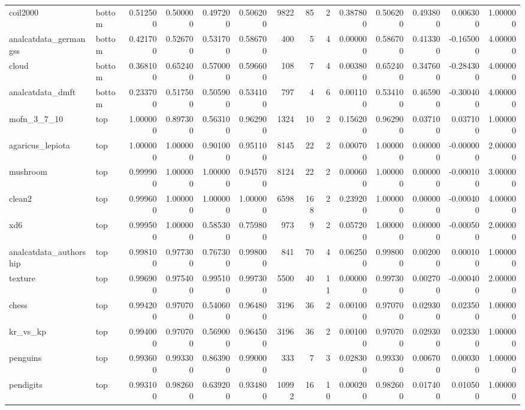 \begin{longtable}{llrrrrrrrrrrrr}
coil2000 & bottom & 0.512500 & 0.500000 & 0.497200 & 0.506200 & 9822 & 85 & 2 & 0.387800 & 0.506200 & 0.493800 & 0.006300 & 1.000000 \\
analcatdata\_germangss & bottom & 0.421700 & 0.526700 & 0.531700 & 0.586700 & 400 & 5 & 4 & 0.000000 & 0.586700 & 0.413300 & -0.165000 & 4.000000 \\
cloud & bottom & 0.368100 & 0.652400 & 0.570000 & 0.596600 & 108 & 7 & 4 & 0.003800 & 0.652400 & 0.347600 & -0.284300 & 4.000000 \\
analcatdata\_dmft & bottom & 0.233700 & 0.517500 & 0.505900 & 0.534100 & 797 & 4 & 6 & 0.001100 & 0.534100 & 0.465900 & -0.300400 & 4.000000 \\
mofn\_3\_7\_10 & top & 1.000000 & 0.897300 & 0.563100 & 0.962900 & 1324 & 10 & 2 & 0.156200 & 0.962900 & 0.037100 & 0.037100 & 1.000000 \\
agaricus\_lepiota & top & 1.000000 & 1.000000 & 0.901000 & 0.951100 & 8145 & 22 & 2 & 0.000700 & 1.000000 & 0.000000 & -0.000000 & 2.000000 \\
mushroom & top & 0.999900 & 1.000000 & 1.000000 & 0.945700 & 8124 & 22 & 2 & 0.000600 & 1.000000 & 0.000000 & -0.000100 & 3.000000 \\
clean2 & top & 0.999600 & 1.000000 & 1.000000 & 1.000000 & 6598 & 168 & 2 & 0.239200 & 1.000000 & 0.000000 & -0.000400 & 4.000000 \\
xd6 & top & 0.999500 & 1.000000 & 0.585300 & 0.759800 & 973 & 9 & 2 & 0.057200 & 1.000000 & 0.000000 & -0.000500 & 2.000000 \\
analcatdata\_authorship & top & 0.998100 & 0.977300 & 0.767300 & 0.998000 & 841 & 70 & 4 & 0.062500 & 0.998000 & 0.002000 & 0.000100 & 1.000000 \\
texture & top & 0.996900 & 0.975400 & 0.995100 & 0.997300 & 5500 & 40 & 11 & 0.000000 & 0.997300 & 0.002700 & -0.000400 & 2.000000 \\
chess & top & 0.994200 & 0.970700 & 0.540600 & 0.964800 & 3196 & 36 & 2 & 0.001000 & 0.970700 & 0.029300 & 0.023500 & 1.000000 \\
kr\_vs\_kp & top & 0.994000 & 0.970700 & 0.569000 & 0.964500 & 3196 & 36 & 2 & 0.001000 & 0.970700 & 0.029300 & 0.023300 & 1.000000 \\
penguins & top & 0.993600 & 0.993300 & 0.863900 & 0.990000 & 333 & 7 & 3 & 0.028300 & 0.993300 & 0.006700 & 0.000300 & 1.000000 \\
pendigits & top & 0.993100 & 0.982600 & 0.639200 & 0.934800 & 10992 & 16 & 10 & 0.000200 & 0.982600 & 0.017400 & 0.010500 & 1.000000 \\

\end{longtable}
